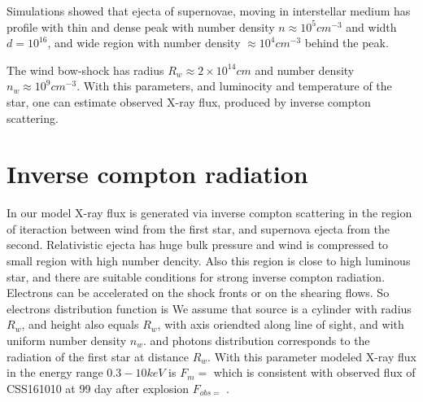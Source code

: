\documentclass[a4paper,12pt]{extreport}
\begin{document}
Simulations showed that ejecta of supernovae, moving in interstellar medium has profile with thin and dense peak with number density $n \approx 10^5 cm^{-3}$ and width $d = 10^{16}$, and wide region with number density $\approx 10^4 cm^{-3}$ behind the peak.

The wind bow-shock has radius $R_w \approx 2\times10^{14} cm$ and number density $n_w \approx 10^9 cm^{-3}$. With this parameters, and luminocity and temperature of the star, one can estimate observed X-ray flux, produced by inverse compton scattering.
 
\section{Inverse compton radiation}\label{compton}

In our model X-ray flux is generated via inverse compton scattering in the region of iteraction between wind from the first star, and supernova ejecta from the second. Relativistic ejecta has huge bulk pressure and wind is compressed to small region with high number dencity. Also this region is close to high luminous star, and there are suitable conditions for strong inverse compton radiation. Electrons can be accelerated on the shock fronts or on the shearing flows. So electrons distribution function is 
We assume that source is a cylinder with radius $R_w$, and height also equals $R_w$, with axis oriendted along line of sight, and with uniform number density $n_w$. 
and photons distribution corresponds to the radiation of the first star at distance $R_w$. With this parameter modeled X-ray flux in the energy range $0.3-10 keV$ is $F_m = $ which is consistent with observed flux of CSS161010 at 99 day after explosion $F_{obs = }$ \cite{Coppejans2020}.



\end{document}
